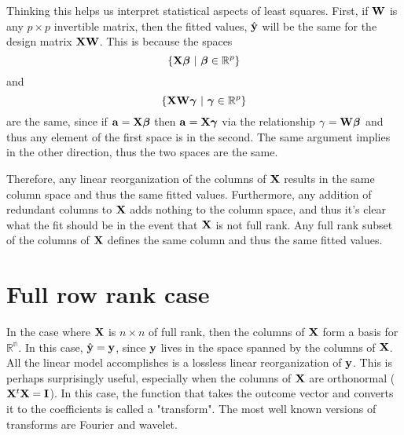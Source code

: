Thinking this helps us interpret statistical aspects of least squares.
First, if $\mathbf{W}$ is any $p\times p $ invertible matrix, then the
fitted values, $\hat {\mathbf{y}}$ will be the same for the design matrix
$\mathbf{X} \mathbf{W}$. This is because the spaces
$$
\{\mathbf{X} \boldsymbol{\beta} ~|~ \boldsymbol{\beta} \in \mathbb{R}^p\}
$$
and
$$
\{\mathbf{X} \mathbf{W} \boldsymbol{\gamma} ~|~ \boldsymbol{\gamma} \in \mathbb{R}^p\}
$$
are the same, since if $\mathbf{a} = \mathbf{X} \boldsymbol{\beta}$ then $\mathbf{a} = \mathbf{X} \boldsymbol{\gamma}$ via the relationship $\gamma = \mathbf{W} \boldsymbol{\beta}$  and thus any element of the first
space is in the second. The same argument implies in the other direction,
thus the two spaces are the same.

Therefore, any linear reorganization of the columns of $\mathbf{X}$ results in the
same column space and thus the same fitted values. Furthermore, any
addition of redundant columns to $\mathbf{X}$ adds nothing to the column space,
and thus it's clear what the fit should be in the event that $\mathbf{X}$ is
not full rank. Any full rank subset of the columns of $\mathbf{X}$ defines
the same column and thus the same fitted values. 

\section{Full row rank case}
In the case where $\mathbf{X}$ is $n\times n$ of full rank,
then the columns of $\mathbf{X}$ form a basis for $\mathbb{R^n}$.
In this case, $\hat {\mathbf{y}} = \mathbf{y}$, since $\mathbf{y}$ lives
in the space spanned by the columns of $\mathbf{X}$. All
the linear model accomplishes is a lossless 
linear reorganization of $\mathbf{y}$. This is perhaps surprisingly
useful, especially when the columns of $\mathbf{X}$ are
orthonormal ($\mathbf{X}^t\mathbf{X} = \mathbf{I}$). In this case, the
function that takes the outcome vector and converts
it to the coefficients is called a "transform". The
most well known versions of transforms are Fourier and
wavelet. 


